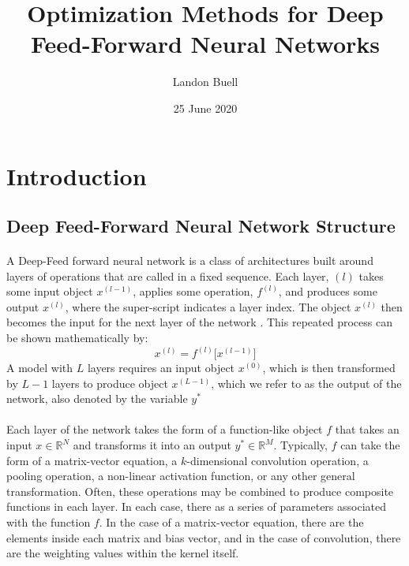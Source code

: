 \documentclass[12pt,letterpaper]{article}
\begin{document}

\title{Optimization Methods for Deep Feed-Forward Neural Networks}
\author{Landon Buell}
\date{25 June 2020}
\maketitle


\section{Introduction}


\subsection{Deep Feed-Forward Neural Network Structure}

\paragraph*{}A Deep-Feed forward neural network is a class of architectures built around layers of operations that are called in a fixed sequence. Each layer, $(l)$ takes some input object $x^{(l-1)}$, applies some operation, $f^{(l)}$, and produces some output $x^{(l)}$, where the super-script indicates a layer index. The object $x^{(l)}$ then becomes the input for the next layer of the network \cite{Geron,Goodfellow}. This repeated process can be shown mathematically by:
\begin{equation}
\label{feed-forward}
x^{(l)} = f^{(l)}\big[x^{(l-1)}\big]
\end{equation}
A model with $L$ layers requires an input object $x^{(0)}$, which is then transformed by $L-1$ layers to produce object $x^{(L-1)}$, which we refer to as the output of the network, also denoted by the variable $y^*$

\paragraph*{}Each layer of the network takes the form of a function-like object $f$ that takes an input $x \in \mathbb{R}^N$ and transforms it into an output $y^* \in \mathbb{R}^M$. Typically, $f$ can take the form of a matrix-vector equation, a $k$-dimensional convolution operation, a pooling operation, a non-linear activation function, or any other general transformation. Often, these operations may be combined to produce composite functions in each layer. In each case, there as a series of parameters associated with the function $f$. In the case of a matrix-vector equation, there are the elements inside each matrix and bias vector, and in the case of convolution, there are the weighting values within the kernel itself. 
\end{document}
